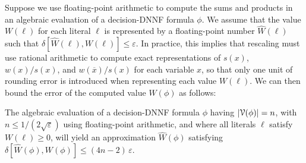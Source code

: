 \documentclass[letterpaper,USenglish,cleveref, autoref, thm-restate]{lipics-v2021}
\newcommand{\obar}[1]{\overline{#1}}
\newcommand{\lit}{\ell}
\newcommand{\approximate}[1]{\hat{#1}}
\newcommand{\approxW}{\approximate{W}}
\newcommand{\aerror}{\delta}
\newcommand{\roundepsilon}{\varepsilon}
\newcommand{\dependencyset}{{\cal V}}
\begin{document}
Suppose we use floating-point arithmetic to compute the sums and
products in an algebraic evaluation of a decision-DNNF formula $\phi$.
We assume that the value $W(\lit)$ for each literal $\lit$ is
represented by a floating-point number $\approxW(\lit)$ such that
$\aerror[\approxW(\lit), W(\lit)] \leq \roundepsilon$.  In practice,
this implies that rescaling must use rational arithmetic to
compute exact representations of $s(x)$, $w(x)/s(x)$, and
$w(\obar{x})/s(x)$ for each variable $x$, so that only one unit of
rounding error is introduced when representing each value $W(\lit)$.
We can then bound the error of the computed value $W(\phi)$ as follows:
\begin{lemma}
  The algebraic evaluation of a decision-DNNF formula $\phi$  having $|\dependencyset(\phi)| = n$, with
  $n \leq 1/(2\sqrt{\roundepsilon})$
  using floating-point arithmetic,
  and where all literals $\ell$ satisfy $W(\lit) \geq 0$,
  will yield an approximation $\approxW(\phi)$ satisfying
  $\aerror[\approxW(\phi), W(\phi)] \leq (4n-2)\,\roundepsilon$.
  \label{lemma:approx:pos}
\end{lemma}
\end{document}
